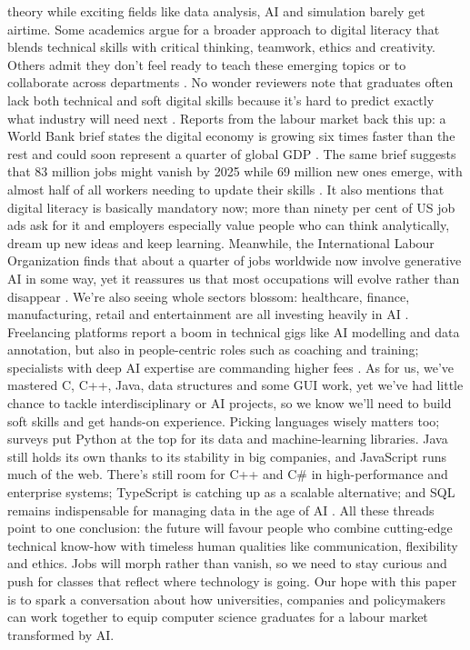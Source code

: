 \documentclass[final,5p,times,twocolumn]{elsarticle}
\begin{document}
theory while exciting fields like data analysis, AI and simulation barely get airtime. Some academics argue for a broader approach to digital literacy that blends technical skills with critical thinking, teamwork, ethics and creativity. Others admit they don't feel ready to teach these emerging topics or to collaborate across departments \cite{M5_2_huang2025digital}. No wonder reviewers note that graduates often lack both technical and soft digital skills because it's hard to predict exactly what industry will need next \cite{M4_1_tee2024demand}. Reports from the labour market back this up: a World Bank brief states the digital economy is growing six times faster than the rest and could soon represent a quarter of global GDP \cite{M11_8_elzir2024building}. The same brief suggests that 83 million jobs might vanish by 2025 while 69 million new ones emerge, with almost half of all workers needing to update their skills \cite{M11_8_elzir2024building}. It also mentions that digital literacy is basically mandatory now; more than ninety per cent of US job ads ask for it and employers especially value people who can think analytically, dream up new ideas and keep learning. Meanwhile, the International Labour Organization finds that about a quarter of jobs worldwide now involve generative AI in some way, yet it reassures us that most occupations will evolve rather than disappear \cite{M12_10_ilo2025impact}. We're also seeing whole sectors blossom: healthcare, finance, manufacturing, retail and entertainment are all investing heavily in AI \cite{M14_12_nexford2025ai}. Freelancing platforms report a boom in technical gigs like AI modelling and data annotation, but also in people-centric roles such as coaching and training; specialists with deep AI expertise are commanding higher fees \cite{M13_11_upwork2025skills}. As for us, we've mastered C, C++, Java, data structures and some GUI work, yet we've had little chance to tackle interdisciplinary or AI projects, so we know we'll need to build soft skills and get hands-on experience. Picking languages wisely matters too; surveys put Python at the top for its data and machine-learning libraries. Java still holds its own thanks to its stability in big companies, and JavaScript runs much of the web. There's still room for C++ and C\# in high-performance and enterprise systems; TypeScript is catching up as a scalable alternative; and SQL remains indispensable for managing data in the age of AI \cite{M15_13_pluralsight2025languages}. All these threads point to one conclusion: the future will favour people who combine cutting-edge technical know-how with timeless human qualities like communication, flexibility and ethics. Jobs will morph rather than vanish, so we need to stay curious and push for classes that reflect where technology is going. Our hope with this paper is to spark a conversation about how universities, companies and policymakers can work together to equip computer science graduates for a labour market transformed by AI.
\end{document}
